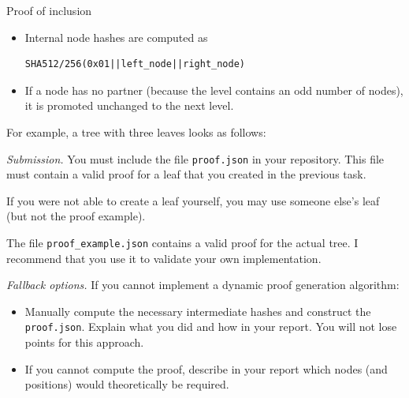 \documentclass{homework}
\begin{document}
\begin{task}{Proof of inclusion}
\begin{itemize}
    \item Internal node hashes are computed as
    \begin{Verbatim}
SHA512/256(0x01||left_node||right_node)
    \end{Verbatim}

  \item If a node has no partner (because the level contains an odd number of nodes), it is promoted unchanged to the next level.
\end{itemize}

  For example, a tree with three leaves looks as follows:
    \begin{figure}[h]
      \centering
  \end{figure}

  \textit{Submission.}
  You must include the file \texttt{proof.json} in your repository.  
  This file must contain a valid proof for a leaf that you created in the previous task.

  If you were not able to create a leaf yourself, you may use someone else's leaf (but not the proof example).

  The file \texttt{proof\_example.json} contains a valid proof for the actual tree.
  I recommend that you use it to validate your own implementation.

  \textit{Fallback options.}
  If you cannot implement a dynamic proof generation algorithm:
  \begin{itemize}
    \item Manually compute the necessary intermediate hashes and construct the \texttt{proof.json}.
    Explain what you did and how in your report.
    You will not lose points for this approach.
    \item If you cannot compute the proof, describe in your report which nodes (and positions) would theoretically be required.
  \end{itemize}
\end{task}
\end{document}

